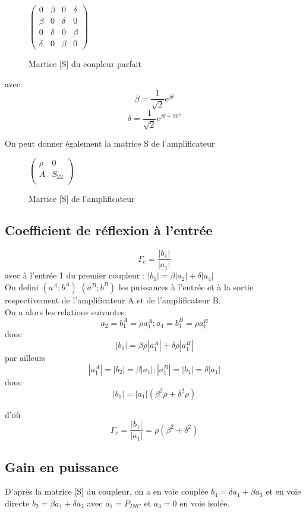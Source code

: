 \documentclass[oneside,a4paper,12pt]{article}
\begin{document}
	\begin{figure}[h]
		\center
		$
		\begin{pmatrix}
		0 & \beta & 0 & \delta \\
		\beta & 0 & \delta & 0 \\
		0 & \delta & 0 & \beta \\
		\delta & 0 & \beta & 0
		\end{pmatrix}
		$
	\caption{Martice [S] du coupleur parfait}
	\end{figure}
	
	avec 
	\[\beta = \frac{1}{\sqrt 2}e^{j \theta} \]
	\[\delta = \frac{1}{\sqrt 2}e^{j \theta + 90 ^{o} } \]

	On peut donner également la matrice S de l'amplificateur

	\begin{figure}[h]
		\centering
		$
		\begin{pmatrix}
		\rho & 0 \\
		A & S_{22} \\
		\end{pmatrix}
		$
	\caption{Martice [S] de l'amplificateur}
	\end{figure}
	\newpage
	\subsection{Coefficient de réflexion à l'entrée}
	\[ \Gamma_{e} = \frac{|b_{1}|}{|a_{1}|} \] 
	avec à l'entrée 1 du premier coupleur : $ |b_{1}| = \beta |a_{2}| + \delta |a_{4}| $ \\
	On defini $ (a^{A};b^{A}) $ $ (a^{B};b^{B}) $  les puissances à l'entrée et à la sortie 
	respectivement de l'amplificateur A et de l'amplificateur B. \\
	On a alors les relations suivantes: \\
	\[ a_{2} = b^{A}_{1} = \rho a^{A}_{1}; a_{4} = b^{B}_{1} = \rho a^{B}_{1}\]
	donc 
	\[ |b_{1}| = \beta \rho |a^{A}_{1}| + \delta \rho |a^{B}_{1}| \]
	par ailleurs 
	\[ |a^{A}_{1}| = |b_{2}| = \beta |a_{1}|; |a^{B}_{1}| = |b_{4}| = \delta |a_{1}| \]
	donc 
	\[ |b_{1}| = |a_{1}|(\beta^{2} \rho + \delta^{2} \rho) \]

	d'o\`u
	\[ \Gamma_{e} = \frac{|b_{1}|}{|a_{1}|} = \rho(\beta^{2} + \delta^{2}) \]

	\subsection{Gain en puissance}

	D'après la matrice [S] du coupleur, on a en voie couplée $ b_{4} = \delta a_{1} + \beta a_{3} $
	et en voie directe $ b_{2} = \beta a_{1} + \delta a_{3} $ avec $ a_{1} = P_{INC} $ et $ a_{3} = 0 $ en voie isolée.
	
\end{document}
